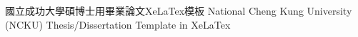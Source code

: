 

\LangDemo %

%

\SetTitle
{國立成功大學碩博士用畢業論文XeLaTex模板}
{National Cheng Kung University (NCKU) Thesis/Dissertation Template in XeLaTex}




\PhdDegree









